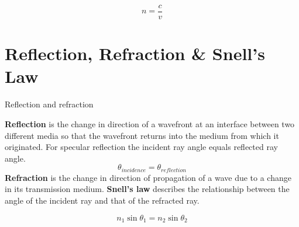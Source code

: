  $$n=\frac{c}{v}$$

\section{Reflection, Refraction \& Snell's Law}
\begin{marginfigure}[20pt]
  \caption{Reflection and refraction}
  \label{fig:marginfig}
\end{marginfigure}
\textbf{Reflection} is the change in direction of a wavefront at an interface between two different media so that the wavefront returns into the medium from which it originated. For specular reflection the incident ray angle equals reflected ray angle.
$$\theta_{incidence}=\theta_{reflection} $$
\textbf{Refraction} is the change in direction of propagation of a wave due to a change in its transmission medium.  \textbf{Snell's law} describes the relationship between the angle of the incident ray and that of the refracted ray.

$$n_1\sin\theta_1=n_2\sin\theta_2$$

